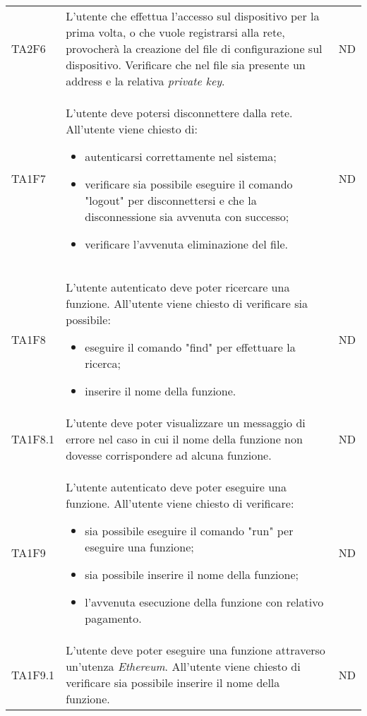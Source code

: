 \begin{longtable}{|C{1.5cm}|C{10cm}|C{1.5cm}|}
	TA2F6 &
	L'utente che effettua l'accesso sul dispositivo per la prima volta, o che vuole registrarsi alla rete, provocherà la creazione del file di configurazione sul dispositivo. Verificare che nel file sia presente un address e la relativa \textit{private key\glo}. &
	ND \\

	TA1F7  &
	L’utente deve potersi disconnettere dalla rete. All’utente viene chiesto di:
	\begin{itemize}
		\item autenticarsi correttamente nel sistema;
		\item verificare sia possibile eseguire il comando "logout" per disconnettersi e che la disconnessione sia avvenuta con successo;
		\item verificare l'avvenuta eliminazione del file.
	\end{itemize} &
	ND \\[-5ex]

	TA1F8  &
	L’utente autenticato deve poter ricercare una funzione. All’utente viene chiesto di verificare sia possibile:
	\begin{itemize}
		\item eseguire il comando "find" per effettuare la ricerca;
		\item inserire il nome della funzione.
	\end{itemize} &
	ND \\[-5ex]

	TA1F8.1  &
	L’utente deve poter visualizzare un messaggio di errore nel caso in cui il nome della funzione non dovesse corrispondere ad alcuna funzione. &
	ND \\

	TA1F9  &
	L’utente autenticato deve poter eseguire una funzione. All’utente viene chiesto di verificare:
	\begin{itemize}
		\item sia possibile eseguire il comando "run" per eseguire una funzione;
		\item sia possibile inserire il nome della funzione;
		\item l'avvenuta esecuzione della funzione con relativo pagamento.
	\end{itemize} &
	ND \\[-5ex]

	TA1F9.1  &
	L’utente deve poter eseguire una funzione attraverso un'utenza \textit{Ethereum\glos}. All’utente viene chiesto di verificare sia possibile inserire il nome della funzione. &
	ND \\


\end{longtable}
